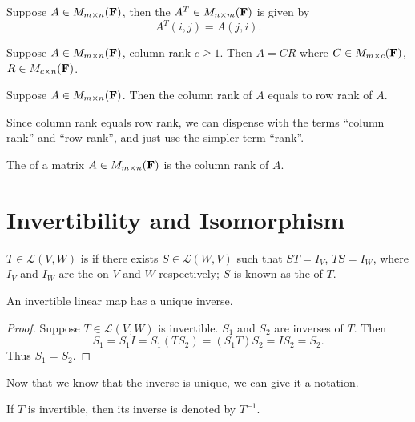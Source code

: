 \begin{definition}[Transpose]
Suppose $A\in M_{m\times n}(\mathbf F)$, then the  $A^T\in M_{n\times m}(\mathbf F)$ is given by
\[A^T(i,j)=A(j,i).\]
\end{definition}

\begin{proposition}
Suppose $A\in M_{m\times n}(\mathbf F)$, column rank $c\ge1$. Then $A=CR$ where $C\in M_{m\times c}(\mathbf F)$, $R\in M_{c\times n}(\mathbf F)$.
\end{proposition}

\begin{proposition}
Suppose $A\in M_{m\times n}(\mathbf F)$. Then the column rank of $A$ equals to row rank of $A$.
\end{proposition}

Since column rank equals row rank, we can dispense with the terms ``column rank'' and ``row rank'', and just use the simpler
term ``rank''.

\begin{definition}[Rank]
The  of a matrix $A\in M_{m\times n}(\mathbf F)$ is the column rank of $A$.
\end{definition}

\section{Invertibility and Isomorphism}
\begin{definition}[Invertibility]
$T\in\mathcal{L}(V,W)$ is  if there exists $S\in\mathcal{L}(W,V)$ such that $ST=I_V$, $TS=I_W$, where $I_V$ and $I_W$ are the  on $V$ and $W$ respectively; $S$ is known as the  of $T$.
\end{definition}

\begin{proposition}
An invertible linear map has a unique inverse.
\end{proposition}

\begin{proof}
Suppose $T\in\mathcal{L}(V,W)$ is invertible. $S_1$ and $S_2$ are inverses of $T$. Then
\[S_1=S_1I=S_1(TS_2)=(S_1T)S_2=IS_2=S_2.\]
Thus $S_1=S_2$.
\end{proof}

Now that we know that the inverse is unique, we can give it a notation.

\begin{notation}
If $T$ is invertible, then its inverse is denoted by $T^{-1}$.
\end{notation}

